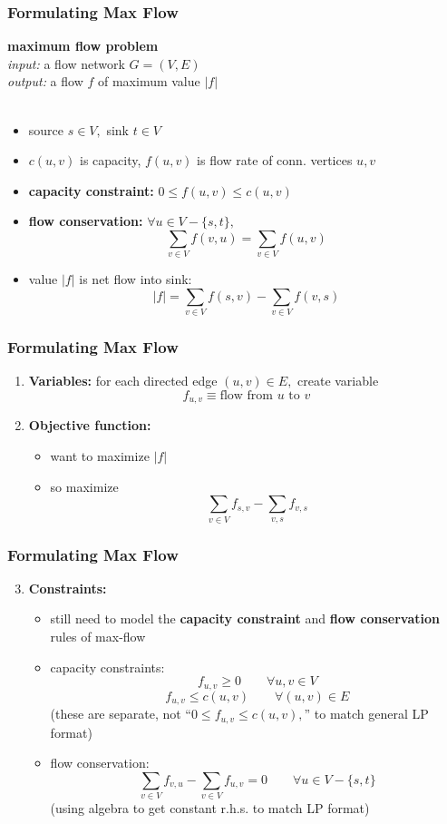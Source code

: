 \documentclass{beamer}
\newcommand{\stanza}{ \\~\ }
\begin{document}
\begin{frame} \frametitle{Formulating Max Flow}
\textbf{maximum flow problem} \\
\emph{input:} a flow network $G=(V,E)$ \\
\emph{output:} a flow $f$ of maximum value $|f|$ \stanza

\begin{itemize}
  \item source $s \in V,$ sink $t \in V$
  \item $c(u, v)$ is capacity, $f(u, v)$ is flow rate of conn. vertices $u, v$
  \item \textbf{capacity constraint:} $0 \leq f(u, v) \leq c(u, v)$
  \item \textbf{flow conservation:}  $\forall u \in V - \{s, t\},$
  \[ \sum_{v \in V} f(v, u) = \sum_{v \in V} f(u, v) \]
  \item value $|f|$ is net flow into sink:
  \[ |f| = \sum_{v \in V} f(s, v) - \sum_{v \in V} f(v, s) \]
\end{itemize}
\end{frame}

\begin{frame} \frametitle{Formulating Max Flow}
\begin{enumerate}
  \item \textbf{Variables:} for each directed edge $(u, v) \in E,$ create variable
  \[ f_{u, v} \equiv \text{flow from } u \text{ to } v \]
  \item \textbf{Objective function:}
  \begin{itemize}
    \item want to maximize $|f|$
    \item so maximize
    \[ \sum_{v \in V} f_{s, v} - \sum_{v, s} f_{v, s} \]
  \end{itemize}
\end{enumerate}
\end{frame}

\begin{frame} \frametitle{Formulating Max Flow}
\begin{enumerate}
  \setcounter{enumi}{2}
  \item \textbf{Constraints:}
  \begin{itemize}
    \item still need to model the \textbf{capacity constraint} and
      \textbf{flow conservation} rules of max-flow
    \item capacity constraints:
    \[ f_{u, v} \geq 0 \qquad \forall u, v \in V \]
    \[ f_{u, v} \leq c(u, v) \qquad \forall (u, v) \in E \]
    (these are separate, not ``$0 \leq f_{u, v} \leq c(u,v),$'' to match general LP format)
    \item flow conservation:
    \[ \sum_{v \in V} f_{v, u} - \sum_{v \in V} f_{u, v} = 0 \qquad \forall u \in V - \{s, t\} \]
    (using algebra to get constant r.h.s. to match LP format)
  \end{itemize}
\end{enumerate}
\end{frame}
\end{document}
